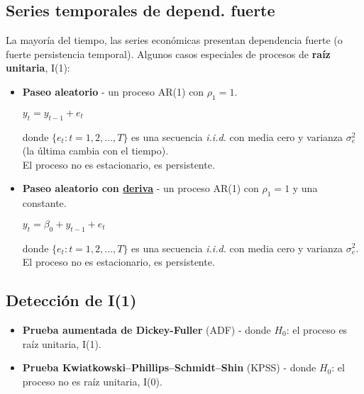 \documentclass[10pt, a4paper, landscape]{extarticle}
\begin{document}
\begin{multicols}{3}
\section*{Series temporales de depend. fuerte}
	La mayoría del tiempo, las series económicas presentan dependencia fuerte (o fuerte persistencia temporal). Algunos casos especiales de procesos de \textbf{raíz unitaria}, I(1):
	\begin{itemize}[leftmargin=*]
		\item \textbf{Paseo aleatorio} - un proceso AR(1) con $\rho_1 = 1$.
		\begin{center}
			$y_t = y_{t-1} + e_t$
		\end{center}
		donde $\lbrace e_t : t = 1, 2, ..., T \rbrace$ es una secuencia \textsl{i.i.d.} con media cero y varianza $\sigma^2_e$ (la última cambia con el tiempo). \\
		El proceso no es estacionario, es persistente.
		\item \textbf{Paseo aleatorio con \href{https://www.youtube.com/watch?v=pS5d77DQHOI}{deriva}} - un proceso AR(1) con $\rho_1 = 1$ y una constante.
		\begin{center}
			$y_t = \beta_0 + y_{t-1} + e_t$
		\end{center}
		donde $\lbrace e_t : t = 1, 2, ..., T \rbrace$ es una secuencia \textsl{i.i.d.} con media cero y varianza $\sigma^2_e$. \\
		El proceso no es estacionario, es persistente.
	\end{itemize}
	\subsection*{Detección de I(1)}
		\begin{itemize}[leftmargin=*]
			\item \textbf{Prueba aumentada de Dickey-Fuller} (ADF) - donde $H_0$: el proceso es raíz unitaria, I(1).
			\item \textbf{Prueba Kwiatkowski–Phillips–Schmidt–Shin} (KPSS) - donde $H_0$: el proceso no es raíz unitaria, I(0).
		\end{itemize}

\end{multicols}
\end{document}
